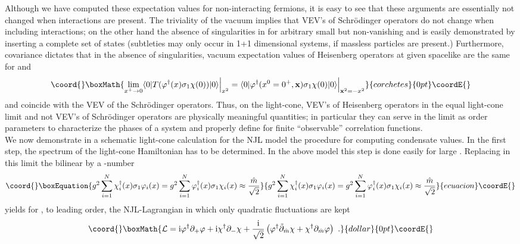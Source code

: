 \documentclass[a4paper,12pt]{article}
\begin{document}
Although we have computed these expectation values for non-interacting fermions, it is easy to
see that these arguments are essentially not changed when interactions are present. The triviality
of the vacuum implies that VEV's of Schr\"odinger operators do not change when including
interactions; on the other hand the absence of singularities in \coordHE{} for arbitrary small but
non-vanishing \coordHE{} and \coordHE{} is easily demonstrated by inserting a complete
set of states (subtleties may only occur in 1+1 dimensional systems,
if massless particles are present.)
Furthermore, covariance dictates that in the absence of singularities,  vacuum expectation values
of Heisenberg operators at given spacelike \coordHE{} are the same for \coordHE{} and
\coordHE{}
\begin{displaymath}\coord{}\boxMath{
\lim_{x^{+}\rightarrow  0}\langle 0 | T (\varphi ^{\dagger}(x)\sigma_{1} \chi(0) ) | 0\rangle
\Big|_{x^{2}}=\langle  0 | \varphi ^{\dagger} (x^{0} = 0^{+},{\bf x} )\sigma_{1} \chi(0)  | 0
\rangle\Big|_{{\bf x}^{2}=-x^{2}}
}{corchetes}{0pt}\coordE{}\end{displaymath}
and coincide with the VEV of the \coordHE{} Schr\"odinger operators. Thus, on the light-cone,
VEV's of Heisenberg operators in the equal light-cone limit and not VEV's of Schr\"odinger
operators are physically meaningful quantities; in particular they can serve in the limit \coordHE{} as order parameters to characterize the phases of a system and properly define
for finite \coordHE{} ``observable'' correlation functions.\\
We now demonstrate in a schematic light-cone calculation for the NJL model the
procedure for computing  condensate values. In the first step, the spectrum  of the light-cone
Hamiltonian has to be determined. In the above model this step is done easily for large \coordHE{}.
Replacing  in this limit the bilinear \coordHE{} by a \coordHE{}-number
\begin{equation}\coord{}\boxEquation{
 \label{mass}
 g^{2}\sum_{i=1}^{N}\chi^{\dagger}_{i}(x)\sigma_{1}\varphi_{i}(x) = g^{2}\sum_{i=1}^{N}
\varphi^{\dagger}_{i}(x)\sigma_{1}\chi_{i}(x)\approx\frac{\hat{m}}{\sqrt{2}}}{
 g^{2}\sum_{i=1}^{N}\chi^{\dagger}_{i}(x)\sigma_{1}\varphi_{i}(x) = g^{2}\sum_{i=1}^{N}
\varphi^{\dagger}_{i}(x)\sigma_{1}\chi_{i}(x)\approx\frac{\hat{m}}{\sqrt{2}}}{ecuacion}\coordE{}\end{equation}
yields for \coordHE{}, to leading order, the NJL-Lagrangian in which only quadratic fluctuations are kept
$$\coord{}\boxMath{{\cal L} = {\rm  i} \varphi ^{\dagger} \partial_{+} \varphi +{\rm  i} \chi ^{\dagger} \partial_{-}
\chi + \frac{{\rm i}}{\sqrt{2}}\left(  \varphi ^{\dagger} \tilde{\partial}_{\hat{m}}  \chi  +
\chi ^{\dagger} \partial_{\hat{m}} \varphi\right)\ .}{dollar}{0pt}\coordE{}$$
\end{document}
